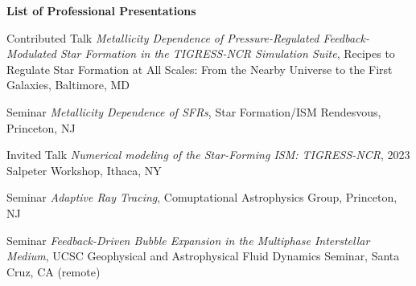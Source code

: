 \documentclass[12pt]{article}
\begin{document}




\begin{itemize}[itemsep=0pt,topsep=\parskip]
\small 
\end{itemize}





\begin{itemize}[itemsep=0pt,topsep=\parskip]
\small 
\end{itemize}


\begin{center}
{\large \bf List of Professional Presentations}
\end{center}


{Contributed Talk}
{\emph{Metallicity Dependence of Pressure-Regulated Feedback-Modulated Star Formation in the TIGRESS-NCR Simulation Suite},
Recipes to Regulate Star Formation at All Scales: From the Nearby Universe to the First Galaxies,
Baltimore, MD}

{Seminar}
{\emph{Metallicity Dependence of SFRs},
Star Formation/ISM Rendesvous,
Princeton, NJ}

{Invited Talk}
{\emph{Numerical modeling of the Star-Forming ISM: TIGRESS-NCR},
2023 Salpeter Workshop,
Ithaca, NY}

{Seminar}
{\emph{Adaptive Ray Tracing},
Comuptational Astrophysics Group,
Princeton, NJ}

{Seminar}
{\emph{Feedback-Driven Bubble Expansion in the Multiphase Interstellar Medium},
UCSC Geophysical and Astrophysical Fluid Dynamics Seminar,
Santa Cruz, CA (remote)}
\end{document}
